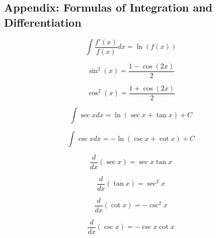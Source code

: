 \documentclass[a4paper,9pt]{scrartcl}
\begin{document}

    \subsection{Appendix: Formulas of Integration and Differentiation}

    \begin{displaymath}
        \int \frac{f'(x)}{f(x)} dx = \ln(f(x))
    \end{displaymath}

    \begin{displaymath}
        \sin^2(x) = \frac{1-\cos(2x)}{2}
    \end{displaymath}

    \begin{displaymath}
        \cos^2(x) = \frac{1+\cos(2x)}{2}
    \end{displaymath}

    \begin{displaymath}
        \int{\sec{x}}dx = \ln{(\sec{x} + \tan{x})} + C
    \end{displaymath}

    \begin{displaymath}
        \int{\csc{x}}dx = -\ln({\csc{x} + \cot{x}}) + C
    \end{displaymath}

    \begin{displaymath}
        \frac{d}{dx}(\sec{x}) = \sec{x}\tan{x}
    \end{displaymath}

    \begin{displaymath}
        \frac{d}{dx}(\tan{x}) = \sec^2{x}
    \end{displaymath}

    \begin{displaymath}
        \frac{d}{dx}(\cot{x}) = -\csc^2{x}
    \end{displaymath}

    \begin{displaymath}
        \frac{d}{dx}(\csc{x}) = -\csc{x}\cot{x}
    \end{displaymath}
\end{document}
